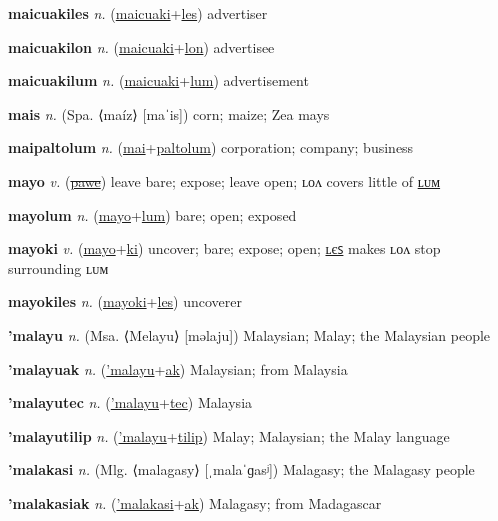 \textbf{\hypertarget{maicuakiles}{maicuakiles}} \textit{n.} (\hyperlink{maicuaki}{maicuaki}+\allowbreak \hyperlink{les}{les})
advertiser

\textbf{\hypertarget{maicuakilon}{maicuakilon}} \textit{n.} (\hyperlink{maicuaki}{maicuaki}+\allowbreak \hyperlink{lon}{lon})
advertisee

\textbf{\hypertarget{maicuakilum}{maicuakilum}} \textit{n.} (\hyperlink{maicuaki}{maicuaki}+\allowbreak \hyperlink{lum}{lum})
advertisement

\textbf{\hypertarget{mais}{mais}} \textit{n.} (Spa. ⟨maíz⟩ [maˈis])
corn; maize; Zea mays

\textbf{\hypertarget{maipaltolum}{maipaltolum}} \textit{n.} (\hyperlink{mai}{mai}+\allowbreak \hyperlink{paltolum}{paltolum})
corporation; company; business

\textbf{\hypertarget{mayo}{mayo}} \textit{v.} (\hyperlink{pawe}{\sout{pawe}})
leave bare; expose; leave open; ʟᴏᴧ covers little of \hyperlink{mayolum}{ʟᴜᴍ}

\textbf{\hypertarget{mayolum}{mayolum}} \textit{n.} (\hyperlink{mayo}{mayo}+\allowbreak \hyperlink{lum}{lum})
bare; open; exposed

\textbf{\hypertarget{mayoki}{mayoki}} \textit{v.} (\hyperlink{mayo}{mayo}+\allowbreak \hyperlink{ki}{ki})
uncover; bare; expose; open; \hyperlink{mayokiles}{ʟєꜱ} makes ʟᴏᴧ stop surrounding ʟᴜᴍ

\textbf{\hypertarget{mayokiles}{mayokiles}} \textit{n.} (\hyperlink{mayoki}{mayoki}+\allowbreak \hyperlink{les}{les})
uncoverer

\textbf{\hypertarget{'malayu}{'malayu}} \textit{n.} (Msa. ⟨Melayu⟩ [məlaju])
Malaysian; Malay; the Malaysian people

\textbf{\hypertarget{'malayuak}{'malayuak}} \textit{n.} (\hyperlink{'malayu}{'malayu}+\allowbreak \hyperlink{ak}{ak})
Malaysian; from Malaysia

\textbf{\hypertarget{'malayutec}{'malayutec}} \textit{n.} (\hyperlink{'malayu}{'malayu}+\allowbreak \hyperlink{tec}{tec})
Malaysia

\textbf{\hypertarget{'malayutilip}{'malayutilip}} \textit{n.} (\hyperlink{'malayu}{'malayu}+\allowbreak \hyperlink{tilip}{tilip})
Malay; Malaysian; the Malay language

\textbf{\hypertarget{'malakasi}{'malakasi}} \textit{n.} (Mlg. ⟨malagasy⟩ [ˌmalaˈɡasʲ])
Malagasy; the Malagasy people

\textbf{\hypertarget{'malakasiak}{'malakasiak}} \textit{n.} (\hyperlink{'malakasi}{'malakasi}+\allowbreak \hyperlink{ak}{ak})
Malagasy; from Madagascar

